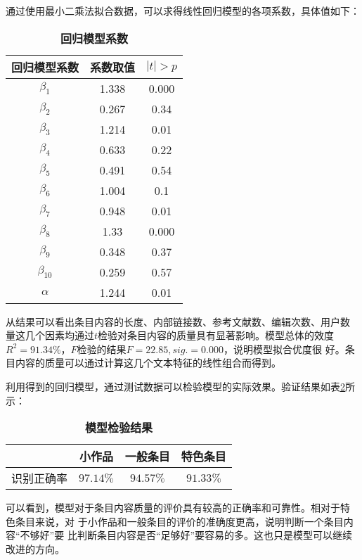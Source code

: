
通过使用最小二乘法拟合数据，可以求得线性回归模型的各项系数，具体值如下：
\begin{table}[htb]
  \centering
\caption{\small{\bf{回归模型系数}}}
 \small
  \begin{tabular}{|c|c|c|}
\hline
    回归模型系数&系数取值&$|t|>p$\\\hline
     $\beta_1$&1.338&0.000\\\hline
$\beta_2$&0.267&0.34\\\hline
$\beta_3$&1.214&0.01\\\hline
$\beta_4$&0.633&0.22\\\hline
$\beta_5$&0.491&0.54\\\hline
$\beta_6$&1.004&0.1\\\hline
$\beta_7$&0.948&0.01\\\hline
$\beta_8$&1.33&0.000\\\hline
$\beta_9$&0.348&0.37\\\hline
$\beta_{10}$&0.259&0.57\\\hline
$\alpha$&1.244&0.01\\\hline
  \end{tabular}
  
  \label{tab:coefficient}
\end{table}

从结果可以看出条目内容的长度、内部链接数、参考文献数、编辑次数、用户数
量这几个因素均通过$t$检验对条目内容的质量具有显著影响。模型总体的效度
$R^2=91.34\%$，$F$检验的结果$F=22.85, sig.=0.000$，说明模型拟合优度很
好。条目内容的质量可以通过计算这几个文本特征的线性组合而得到。

利用得到的回归模型，通过测试数据可以检验模型的实际效果。验证结果如表\ref{tab:model-test}所
示：
\begin{table}[htb]
  \centering
\small
\caption{\small{\bf{模型检验结果}}} 
 \begin{tabular}{|c|c|c|c|}
 \hline
    &小作品&一般条目&特色条目\\\hline
识别正确率&$97.14\%$&$94.57\%$&$91.33\%$\\\hline
  \end{tabular}
  
  \label{tab:model-test}
\end{table}
可以看到，模型对于条目内容质量的评价具有较高的正确率和可靠性。相对于特
色条目来说，对
于小作品和一般条目的评价的准确度更高，说明判断一个条目内容“不够好”要
比判断条目内容是否“足够好”要容易的多。这也只是模型可以继续改进的方向。

